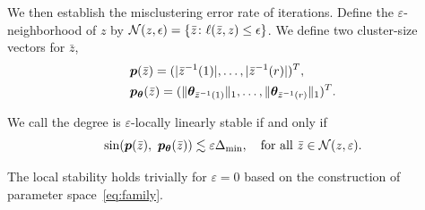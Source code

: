 \documentclass[lettersize,journal]{IEEEtran}
\theoremstyle{definition}
\theoremstyle{definition}
\newcommand{\of}[1]{\left(#1\right)}
\begin{document}
We then establish the misclustering error rate of iterations. Define the $\varepsilon$-neighborhood of $z$ by $\mathcal{N}(z,\epsilon)=\{\bar z\colon \ell(\bar z, z)\leq \epsilon\}$. We define two cluster-size vectors for $\bar z$,
\begin{align}
    &\bm{p}(\bar z)=(|\bar z^{-1}(1)|, \ldots,|\bar z^{-1}(r)|)^T,\\
    &\bm{p}_{\boldsymbol{\theta}}(\bar z)=(\lVert\boldsymbol{\theta}_{\bar z^{-1}(1)}\rVert_1,\ldots,\lVert\boldsymbol{\theta}_{\bar z^{-1}(r)}\rVert_1)^T.
\end{align}

We call the degree is $\varepsilon$-locally linearly stable if and only if 
\begin{equation}
    \sin(\bm{p}(\bar z),\ \bm{p}_{\boldsymbol{\theta}}(\bar z))\lesssim \varepsilon \Delta_{\min} ,\quad \text{for all } \bar z\in \mathcal{N}(z, \varepsilon).
\end{equation}

The local stability holds trivially for $\varepsilon=0$ based on the construction of parameter space~\eqref{eq:family}.
 

\end{document}
